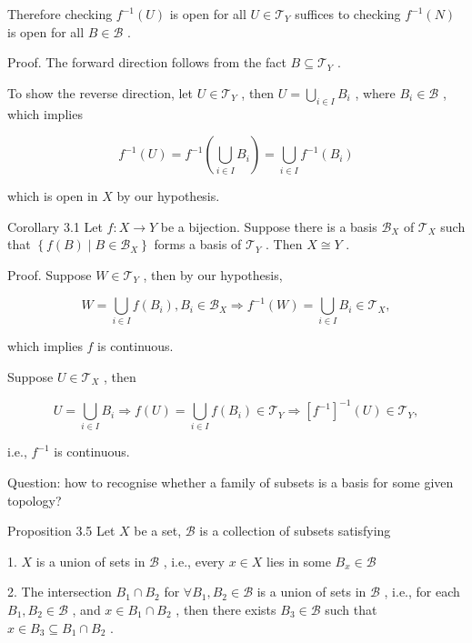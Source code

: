 Therefore checking \({f}^{-1}\left( U\right)\) is open for all \(U \in  {\mathcal{T}}_{Y}\) suffices to checking \({f}^{-1}\left( N\right)\) is open for all \(B \in  \mathcal{B}\) .

Proof. The forward direction follows from the fact \(B \subseteq  {\mathcal{T}}_{Y}\) .

To show the reverse direction, let \(U \in  {\mathcal{T}}_{Y}\) , then \(U = \mathop{\bigcup }\limits_{{i \in  I}}{B}_{i}\) , where \({B}_{i} \in  \mathcal{B}\) , which implies

\[
{f}^{-1}\left( U\right)  = {f}^{-1}\left( {\mathop{\bigcup }\limits_{{i \in  I}}{B}_{i}}\right)  = \mathop{\bigcup }\limits_{{i \in  I}}{f}^{-1}\left( {B}_{i}\right)
\]

which is open in \(X\) by our hypothesis.

Corollary 3.1 Let \(f : X \rightarrow  Y\) be a bijection. Suppose there is a basis \({\mathcal{B}}_{X}\) of \({\mathcal{T}}_{X}\) such that \(\left\{  {f\left( B\right)  \mid  B \in  {\mathcal{B}}_{X}}\right\}\) forms a basis of \({\mathcal{T}}_{Y}\) . Then \(X \cong  Y\) .

Proof. Suppose \(W \in  {\mathcal{T}}_{Y}\) , then by our hypothesis,

\[
W = \mathop{\bigcup }\limits_{{i \in  I}}f\left( {B}_{i}\right) ,{B}_{i} \in  {\mathcal{B}}_{X} \Rightarrow  {f}^{-1}\left( W\right)  = \mathop{\bigcup }\limits_{{i \in  I}}{B}_{i} \in  {\mathcal{T}}_{X},
\]

which implies \(f\) is continuous.

Suppose \(U \in  {\mathcal{T}}_{X}\) , then

\[
U = \mathop{\bigcup }\limits_{{i \in  I}}{B}_{i} \Rightarrow  f\left( U\right)  = \mathop{\bigcup }\limits_{{i \in  I}}f\left( {B}_{i}\right)  \in  {\mathcal{T}}_{Y} \Rightarrow  {\left\lbrack  {f}^{-1}\right\rbrack  }^{-1}\left( U\right)  \in  {\mathcal{T}}_{Y},
\]

i.e., \({f}^{-1}\) is continuous.

Question: how to recognise whether a family of subsets is a basis for some given topology?

Proposition 3.5 Let \(X\) be a set, \(\mathcal{B}\) is a collection of subsets satisfying

1. \(X\) is a union of sets in \(\mathcal{B}\) , i.e., every \(x \in  X\) lies in some \({B}_{x} \in  \mathcal{B}\)

2. The intersection \({B}_{1} \cap  {B}_{2}\) for \(\forall {B}_{1},{B}_{2} \in  \mathcal{B}\) is a union of sets in \(\mathcal{B}\) , i.e., for each \({B}_{1},{B}_{2} \in  \mathcal{B}\) , and \(x \in  {B}_{1} \cap  {B}_{2}\) , then there exists \({B}_{3} \in  \mathcal{B}\) such that \(x \in  {B}_{3} \subseteq  {B}_{1} \cap  {B}_{2}\) .

